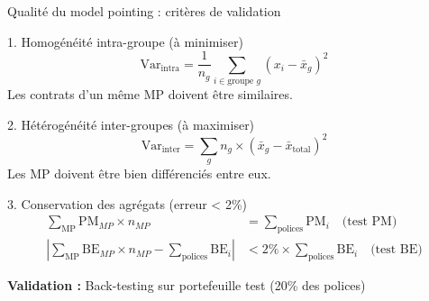 \documentclass[10pt,aspectratio=169]{beamer}
\newcommand{\BE}{\text{BE}}
\newcommand{\PM}{\text{PM}}
\begin{document}
\begin{frame}{Qualité du model pointing : critères de validation}
\begin{block}{1. Homogénéité intra-groupe (à minimiser)}
\[
\boxed{\text{Var}_{\text{intra}} = \frac{1}{n_g} \sum_{i \in \text{groupe } g} (x_i - \bar{x}_g)^2}
\]
Les contrats d'un même MP doivent être similaires.
\end{block}

\begin{block}{2. Hétérogénéité inter-groupes (à maximiser)}
\[
\boxed{\text{Var}_{\text{inter}} = \sum_{g} n_g \times (\bar{x}_g - \bar{x}_{\text{total}})^2}
\]
Les MP doivent être bien différenciés entre eux.
\end{block}

\begin{block}{3. Conservation des agrégats (erreur < 2\%)}
\begin{align*}
\sum_{\text{MP}} \PM_{MP} \times n_{MP} &= \sum_{\text{polices}} \PM_i \quad \text{(test PM)} \\
\left|\sum_{\text{MP}} \BE_{MP} \times n_{MP} - \sum_{\text{polices}} \BE_i\right| &< 2\% \times \sum_{\text{polices}} \BE_i \quad \text{(test BE)}
\end{align*}
\end{block}

\textbf{Validation :} Back-testing sur portefeuille test (20\% des polices)
\end{frame}
\end{document}
